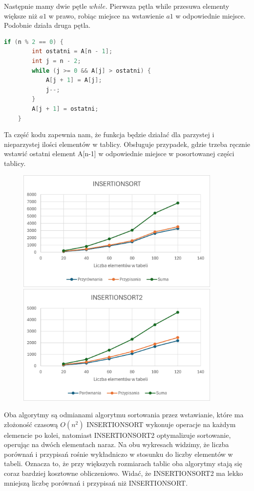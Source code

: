 \documentclass{article}
\begin{document}
	Następnie mamy dwie pętle \(while\). Pierwsza pętla while przesuwa elementy większe niż \(a1\) w prawo, robiąc miejsce na wstawienie \(a1\) w odpowiednie miejsce. Podobnie działa druga pętla.
	\begin{lstlisting}[language=C++, tabsize=3]
	if (n % 2 == 0) {
		int ostatni = A[n - 1];
		int j = n - 2;
		while (j >= 0 && A[j] > ostatni) {
			A[j + 1] = A[j];
			j--;
		}
		A[j + 1] = ostatni;
	}
	\end{lstlisting}
	Ta część kodu zapewnia nam, że funkcja będzie działać dla parzystej i nieparzystej ilości elementów w tablicy. Obsługuje przypadek, gdzie trzeba ręcznie wstawić ostatni element A[n-1] w odpowiednie miejsce w posortowanej części tablicy.
	
	\begin{figure}[H]
		\centering
		\includegraphics[width=0.9\textwidth]{INS1.jpg}
		\includegraphics[width=0.9\textwidth]{INS2.png}
	\end{figure}
	
	Oba algorytmy są odmianami algorytmu sortowania przez wstawianie, które ma złożoność czasową \( O(n^2) \) INSERTIONSORT wykonuje operacje na każdym elemencie po kolei, natomiast INSERTIONSORT2 optymalizuje sortowanie, operując na dwóch elementach naraz. Na obu wykresach widzimy, że liczba porównań i przypisań rośnie wykładniczo w stosunku do liczby elementów w tabeli. Oznacza to, że przy większych rozmiarach tablic oba algorytmy stają się coraz bardziej kosztowne obliczeniowo. Widać, że INSERTIONSORT2 ma lekko mniejszą liczbę porównań i przypisań niż INSERTIONSORT.
	
\end{document}
